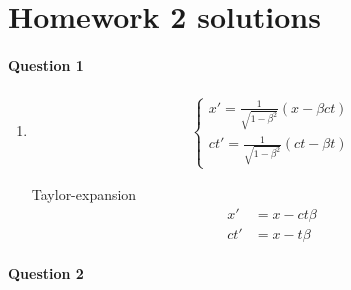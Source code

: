 \documentclass[11pt,a4paper]{article}
\author{Zehao Gao}
\begin{document}
\section*{Homework 2 solutions}

\paragraph{Question 1}

\begin{enumerate}

\item[]

\begin{align}
\left\{
\begin{array}{lcl}
x'=\frac{1}{\sqrt{1-\beta^2}}(x-\beta ct) \\
ct'=\frac{1}{\sqrt{1-\beta^2}}(ct-\beta t)
\end{array}
\right.
\end{align}

Taylor-expansion
\begin{align}
x'&=x-ct\beta \\
ct'&=x-t\beta
\end{align}

\end{enumerate}

\newpage

\paragraph{Question 2}
\end{document}
